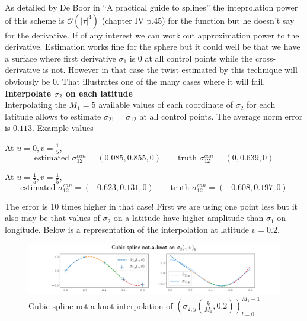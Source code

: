 \documentclass[a4paper, 11pt]{article}
\begin{document}
As detailed by De Boor in “A practical guide to splines” the inteprolation power of this scheme is 
$\mathcal{O}(|\tau|^4)$ (chapter IV p.45) for the function but he doesn't say for the derivative. If of any interest we 
can work out approximation power to the derivative. Estimation works fine for the sphere but it could well be that we 
have a surface where first derivative $\sigma_1$ is $0$ at all control points while the cross-derivative is not. However 
in that case the twist estimated by this technique will obviously be 0. That illustrates one of the many cases where it 
will fail.  \\

\textbf{Interpolate $\sigma_2$ on each latitude} \mbox{} \\

Interpolating the $M_1=5$ available values of each coordinate of $\sigma_2$ for each latitude allows to estimate 
$\sigma_{21}=\sigma_{12}$ at all control points. The average norm error is $0.113$. Example values 

At $u=0, v=\frac{1}{5}$,
\begin{equation*}
  \text{estimated } \sigma_{12}^{can} = (0.085, 0.855, 0) \qquad \text{truth } \sigma_{12}^{can} = (0, 0.639, 0) 
\end{equation*}

At $u=\frac{1}{5}, v=\frac{1}{5}$,
\begin{equation*}
  \text{estimated } \sigma_{12}^{can} = (-0.623, 0.131, 0) \qquad \text{truth } \sigma_{12}^{can} = (-0.608, 0.197, 0) 
\end{equation*}

The error is 10 times higher in that case! First we are using one point less but it also may be that values of 
$\sigma_2$ on a latitude have higher amplitude than $\sigma_1$ on longitude. Below is a representation of the 
interpolation at latitude $v=0.2$. 

\begin{figure}[h!]
  \includegraphics[width=\textwidth]{cubic_sigma_2.png}
  \caption{Cubic spline not-a-knot interpolation of ${\left(\sigma_{2,y}(\frac{k}{M_1}, 0.2)\right)}_{l=0}^{M_1-1}$}
\end{figure}
\end{document}

